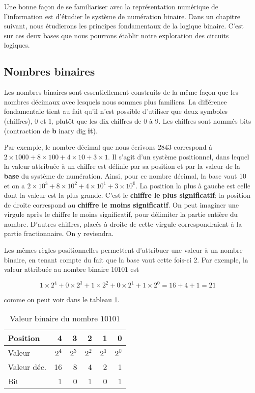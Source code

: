 \documentclass[11pt]{article}
\begin{document}
Une bonne façon de se familiariser avec la représentation numérique de
l'information est d'étudier le système de numération binaire. Dans un
chapitre suivant, nous étudierons les principes fondamentaux de la
logique binaire. C'est sur ces deux bases que nous pourrons établir
notre exploration des circuits logiques.

\subsection{Nombres binaires}
\label{sec:orgd0db7cf}

Les nombres binaires sont essentiellement construits de la même façon
que les nombres décimaux avec lesquels nous sommes plus familiers. La
différence fondamentale tient au fait qu'il n'est possible d'utiliser
que deux symboles (chiffres), 0 et 1, plutôt que les dix chiffres de 0
à 9. Les chiffres sont nommés bits (contraction de \textbf{b} inary dig
\textbf{it}).

Par exemple, le nombre décimal que nous écrivons \(2843\) correspond à
\(2 \times 1000 + 8 \times 100 + 4 \times 10 + 3 \times 1\). Il s'agit
d'un système positionnel, dans lequel la valeur attribuée à un chiffre
est définie par sa position et par la valeur de la \textbf{base} du système
de numération. Ainsi, pour ce nombre décimal, la base vaut 10 et on a
\(2 \times 10^3 + 8 \times 10^2 + 4 \times 10^1 + 3 \times 10^0\). La
position la plus à gauche est celle dont la valeur est la plus
grande. C'est le \textbf{chiffre le plus significatif}; la position de droite
correspond au \textbf{chiffre le moins significatif}. On peut imaginer une
virgule après le chiffre le moins significatif, pour délimiter la
partie entière du nombre. D'autres chiffres, placés à droite de cette
virgule correspondraient à la partie fractionnaire. On y reviendra.

Les mêmes règles positionnelles permettent d'attribuer une valeur à un
nombre binaire, en tenant compte du fait que la base vaut cette
fois-ci 2. Par exemple, la valeur attribuée au nombre binaire
\(10101\) est 

$$ 1 \times 2^4 + 0 \times 2^3 + 1 \times 2^2 + 0 \times 2^1 + 1
\times 2^0 = 16+4+1= 21 $$

comme on peut voir dans le tableau \ref{tab:org7491805}.

\begin{table}[htbp]
\caption{\label{tab:org7491805}Valeur binaire du nombre \(10101\)}
\centering
\begin{tabular}{lrrrrr}
Position & 4 & 3 & 2 & 1 & 0\\
\hline
Valeur & \(2^4\) & \(2^3\) & \(2^2\) & \(2^1\) & \(2^0\)\\
Valeur déc. & 16 & 8 & 4 & 2 & 1\\
Bit & 1 & 0 & 1 & 0 & 1\\
\end{tabular}
\end{table}
\end{document}
